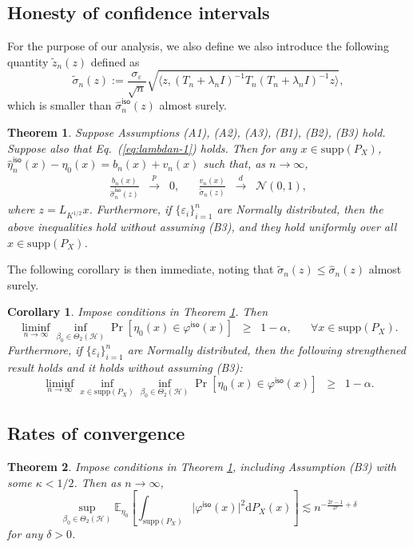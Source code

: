 \documentclass[11pt,a4paper]{article}
\renewcommand{\hat}{\widehat}
\renewcommand{\tilde}{\widetilde}
\theoremstyle{definition}
\theoremstyle{plain}
\newtheorem{theorem}{Theorem}[section]
\newtheorem{corollary}{Corollary}[section]
\theoremstyle{remark}
\newcommand{\supp}{\mathrm{supp}}
\newcommand{\ud}{\mathrm d}
\newcommand{\mH}{\mathcal H}
\newcommand{\iso}{\mathsf{iso}}
\begin{document}
\subsection{Honesty of confidence intervals}

For the purpose of our analysis, we also define
we also introduce the following quantity $\tilde z_n(z)$ defined as
$$
\tilde\sigma_n(z) := \frac{\sigma_\varepsilon}{\sqrt{n}}\sqrt{\langle z, (T_n+\lambda_n I)^{-1}T_n(T_n+\lambda_n I)^{-1}z\rangle},
$$
which is smaller than $\hat\sigma_n^\iso(z)$ almost surely.

\begin{theorem}
Suppose Assumptions (A1), (A2), (A3), (B1), (B2), (B3) hold. Suppose also that Eq.~(\ref{eq:lambdan-1}) holds. Then 
for any $x\in\supp(P_X)$, $\hat\eta_n^\iso(x)-\eta_0(x)=b_n(x)+v_n(x)$ such that, as $n\to\infty$, 
\begin{align*}
\frac{b_n(x)}{\hat\sigma_n^\iso(z)}\;\;\overset{p}{\to}\;\; 0,\;\;\;\;\;\;\frac{v_n(x)}{\tilde\sigma_n(z)}\;\;\overset{d}{\to}\;\;\mathcal N(0,1),
\end{align*}
where $z=L_{K^{1/2}}x$.
Furthermore, if $\{\varepsilon_i\}_{i=1}^n$ are Normally distributed, then the above inequalities hold without assuming (B3), and they hold \emph{uniformly} over all $x\in\supp(P_X)$.
\label{thm:isokrr-limiting}
\end{theorem}

The following corollary is then immediate, noting that $\tilde\sigma_n(z)\leq\hat\sigma_n(z)$ almost surely.
\begin{corollary}
Impose conditions in Theorem \ref{thm:isokrr-limiting}. Then
$$
\liminf_{n\to\infty}\inf_{\beta_0\in\Theta_2(\mH)}\Pr[\eta_0(x)\in\varphi^\iso(x)]\;\;\geq\;\; 1-\alpha,\;\;\;\;\;\;\forall x\in\supp(P_X).
$$
Furthermore, if $\{\varepsilon_i\}_{i=1}^n$ are Normally distributed, then the following strengthened result holds and it holds without assuming (B3):
$$
\liminf_{n\to\infty}\inf_{x\in\supp(P_X)}\inf_{\beta_0\in\Theta_2(\mH)}\Pr[\eta_0(x)\in\varphi^\iso(x)] \;\;\geq\;\; 1-\alpha.
$$
\label{cor:isokrr-ci}
\end{corollary}

\subsection{Rates of convergence}

\begin{theorem}
Impose conditions in Theorem \ref{thm:isokrr-limiting}, including Assumption (B3) with some $\kappa<1/2$. Then as $n\to\infty$, 
\begin{equation}
\sup_{\beta_0\in\Theta_2(\mH)}\mathbb E_{\eta_0}\left[\int_{\supp(P_X)}\big|\varphi^\iso(x)\big|^2\ud P_X(x)\right]\lesssim n^{-\frac{2r-1}{2r}+\delta}
\label{eq:simple-validity}
\end{equation}
for any $\delta>0$.
\label{thm:isokrr-rates}
\end{theorem}
\end{document}

